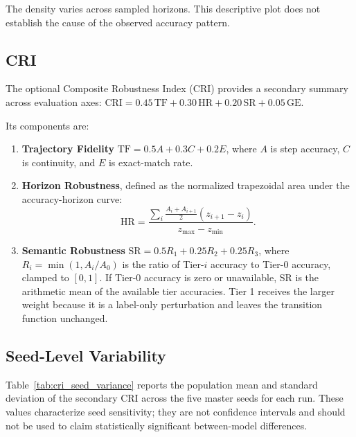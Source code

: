 \documentclass{article}
\begin{document}
The density varies across sampled horizons. This descriptive plot does not establish the cause of the observed accuracy pattern.

\subsection{CRI}
\label{app:CRI}
The optional Composite Robustness Index (CRI) provides a secondary summary across evaluation axes:
 $\text{CRI} = 0.45\,\text{TF}
+0.30\,\text{HR}
+0.20\,\text{SR}
+0.05\,\text{GE}$.

Its components are:
\begin{enumerate}
    \item \textbf{Trajectory Fidelity}
    $\text{TF} = 0.5A + 0.3C + 0.2E$,
    where $A$ is step accuracy, $C$ is continuity, and $E$ is exact-match rate.

    \item \textbf{Horizon Robustness}, defined as the normalized trapezoidal area under the accuracy-horizon curve:
    \[
    \text{HR} =
    \frac{
    \displaystyle\sum_i
    \frac{A_i+A_{i+1}}{2}
    (z_{i+1}-z_i)
    }{
    z_{\max}-z_{\min}
    }.
    \]

    \item \textbf{Semantic Robustness}
    $\text{SR} = 0.5R_1 + 0.25R_2 + 0.25R_3$,
    where $R_i=\min(1,A_i/A_0)$ is the ratio of Tier-$i$ accuracy to Tier-0 accuracy, clamped to $[0,1]$. If Tier-0 accuracy is zero or unavailable, SR is the arithmetic mean of the available tier accuracies. Tier 1 receives the larger weight because it is a label-only perturbation and leaves the transition function unchanged.
\end{enumerate}

\subsection{Seed-Level Variability}
\label{app:seed_variance}
Table~\ref{tab:cri_seed_variance} reports the population mean and standard
deviation of the secondary CRI across the five master seeds for each
run. These values characterize seed sensitivity; they are not
confidence intervals and should not be used to claim statistically significant
between-model differences.
\end{document}
